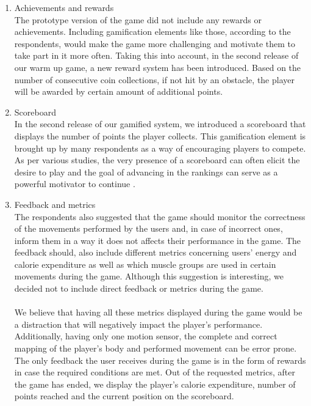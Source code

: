 \begin{enumerate}
\item Achievements and rewards\\
The prototype version of the game did not include any rewards or achievements. Including gamification elements like those, according to the respondents, would make the game more challenging and motivate them to take part in it more often. Taking this into account, in the second release of our warm up game, a new reward system has been introduced. Based on the number of consecutive coin collections, if not hit by an obstacle, the player will be awarded by certain amount of additional points. 
\item Scoreboard\\
In the second release of our gamified system, we introduced a scoreboard that displays the number of points the player collects. This gamification element is brought up by many respondents as a way of encouraging players to compete. As per various studies, the very presence of a scoreboard can often elicit the desire to play and the goal of advancing in the rankings can serve as a powerful motivator to continue \cite{schobel2016agony}. 
\item Feedback and metrics\\
The respondents also suggested that the game should monitor the correctness of the movements performed by the users and, in case of incorrect ones, inform them in a way it does not affects their performance in the game. The feedback should, also include different metrics concerning users' energy and calorie expenditure as well as which muscle groups are used in certain movements during the game. Although this suggestion is interesting, we decided not to include direct feedback or metrics during the game. \\\\We believe that having all these metrics displayed during the game would be a distraction that will negatively impact the player's performance. Additionally, having only one motion sensor, the complete and correct mapping of the player's body and performed movement can be error prone. The only feedback the user receives during the game is in the form of rewards in case the required conditions are met. Out of the requested metrics, after the game has ended, we display the player's calorie expenditure, number of points reached and the current position on the scoreboard.  
	\end{enumerate}
